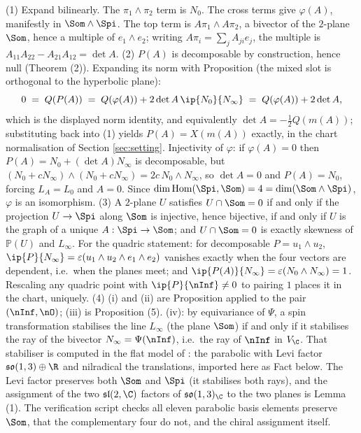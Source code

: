 (1) Expand bilinearly. The $\pi_1\wedge\pi_2$ term is $N_0$. The cross terms give $\varphi(A)$, manifestly in $\Som\wedge\Spi$. The top term is $A\pi_1\wedge A\pi_2$, a bivector of the $2$-plane $\Som$, hence a multiple of $e_1\wedge e_2$; writing $A\pi_i = \sum_j A_{ji}e_j$, the multiple is $A_{11}A_{22} - A_{21}A_{12} = \det A$.
(2) $P(A)$ is decomposable by construction, hence null (Theorem (2)). Expanding its norm with Proposition  (the mixed slot is orthogonal to the hyperbolic plane):
\[
0 \;=\; Q(P(A)) \;=\; Q(\varphi(A)) + 2\det A\,\ip{N_0}{N_\infty}
 \;=\; Q(\varphi(A)) + 2\det A ,
\]
which is the displayed norm identity, and equivalently $\det A = -\tfrac12Q(m(A))$; substituting back into (1) yields $P(A) = X(m(A))$ exactly, in the chart normalisation of Section \ref{sec:setting}. Injectivity of $\varphi$: if $\varphi(A) = 0$ then $P(A) = N_0 + (\det A)N_\infty$ is decomposable, but $(N_0 + cN_\infty)\wedge(N_0 + cN_\infty) = 2c\,N_0\wedge N_\infty$, so $\det A = 0$ and $P(A) = N_0$, forcing $L_A = L_0$ and $A = 0$. Since $\dim \operatorname{Hom}(\Spi,\Som) = 4 = \dim(\Som\wedge\Spi)$, $\varphi$ is an isomorphism.
(3) A $2$-plane $U$ satisfies $U \cap \Som = 0$ if and only if the projection $U \to \Spi$ along $\Som$ is injective, hence bijective, if and only if $U$ is the graph of a unique $A: \Spi \to \Som$; and $U \cap \Som = 0$ is exactly skewness of $\mathbb{P}(U)$ and $L_\infty$. For the quadric statement: for decomposable $P = u_1\wedge u_2$, $\ip{P}{N_\infty} = \varepsilon(u_1\wedge u_2\wedge e_1\wedge e_2)$ vanishes exactly when the four vectors are dependent, i.e.\ when the planes meet; and $\ip{P(A)}{N_\infty} = \varepsilon(N_0\wedge N_\infty) = 1$. Rescaling any quadric point with $\ip{P}{\nInf} \neq 0$ to pairing $1$ places it in the chart, uniquely.
(4) (i) and (ii) are Proposition  applied to the pair $(\nInf, \nO)$; (iii) is Proposition (5). (iv): by equivariance of $\Psi$, a spin transformation stabilises the line $L_\infty$ (the plane $\Som$) if and only if it stabilises the ray of the bivector $N_\infty = \Psi(\nInf)$, i.e.\ the ray of $\nInf$ in $V_\C$. That stabiliser is computed in the flat model of \cite{ButlerT6}: the parabolic with Levi factor $\mathfrak{so}(1,3)\oplus\R$ and nilradical the translations, imported here as Fact  below. The Levi factor preserves both $\Som$ and $\Spi$ (it stabilises both rays), and the assignment of the two $\mathfrak{sl}(2,\C)$ factors of $\mathfrak{so}(1,3)_\C$ to the two planes is Lemma (1). The verification script checks all eleven parabolic basis elements preserve $\Som$, that the complementary four do not, and the chiral assignment itself.
